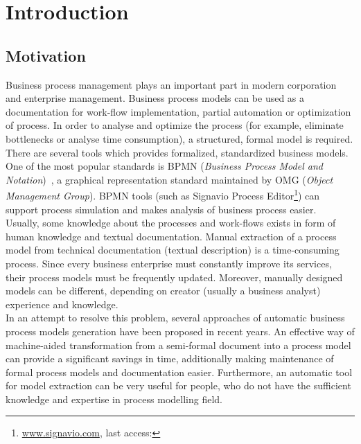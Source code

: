 \chapter{Introduction}
\label{cha:introduction}
\section{Motivation}
Business process management plays an important part in modern corporation and enterprise management. Business process models can be used as a documentation for work-flow implementation, partial automation or optimization of process.  In order to analyse and optimize the process (for example, eliminate bottlenecks or analyse time consumption), a structured, formal model is required. There are several tools which provides formalized, standardized business models. One of the most popular standards is BPMN (\emph{Business Process Model and Notation})~\cite{BPMN20}, a graphical representation standard maintained by OMG (\emph{Object Management Group}). BPMN tools (such as Signavio Process Editor\footnote{\url{www.signavio.com}, last access: \onlineAccess}) can support process simulation and makes analysis of business process easier.\\
Usually, some knowledge about the processes and work-flows exists in form of human knowledge and textual documentation. Manual extraction of a process model from technical documentation (textual description) is a time-consuming process. Since every business enterprise must constantly improve its services, their process models must be frequently updated. Moreover, manually designed models can be different, depending on creator (usually a business analyst) experience and knowledge.\\
In an attempt to resolve this problem, several approaches of automatic business process models generation have been proposed in recent years. An effective way of machine-aided transformation from a semi-formal document into a process model can provide a significant savings in time, additionally making maintenance of formal process models and documentation easier. Furthermore, an automatic tool for model extraction can be very useful for people, who do not have the sufficient knowledge and expertise in process modelling field.

